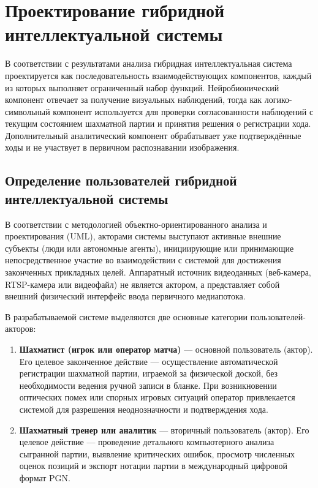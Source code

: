 \section{Проектирование гибридной интеллектуальной системы}

В соответствии с результатами анализа гибридная интеллектуальная система проектируется как последовательность взаимодействующих компонентов, каждый из которых выполняет ограниченный набор функций. Нейробионический компонент отвечает за получение визуальных наблюдений, тогда как логико-символьный компонент используется для проверки согласованности наблюдений с текущим состоянием шахматной партии и принятия решения о регистрации хода. Дополнительный аналитический компонент обрабатывает уже подтверждённые ходы и не участвует в первичном распознавании изображения.

\subsection{Определение пользователей гибридной интеллектуальной системы}

В соответствии с методологией объектно-ориентированного анализа и проектирования (UML), акторами системы выступают активные внешние субъекты (люди или автономные агенты), инициирующие или принимающие непосредственное участие во взаимодействии с системой для достижения законченных прикладных целей. Аппаратный источник видеоданных (веб-камера, RTSP-камера или видеофайл) не является актором, а представляет собой внешний физический интерфейс ввода первичного медиапотока.

В разрабатываемой системе выделяются две основные категории пользователей-акторов:

\begin{enumerate}
    \item \textbf{Шахматист (игрок или оператор матча)} --- основной пользователь (актор). Его целевое законченное действие --- осуществление автоматической регистрации шахматной партии, играемой за физической доской, без необходимости ведения ручной записи в бланке. При возникновении оптических помех или спорных игровых ситуаций оператор привлекается системой для разрешения неоднозначности и подтверждения хода.
    \item \textbf{Шахматный тренер или аналитик} --- вторичный пользователь (актор). Его целевое действие --- проведение детального компьютерного анализа сыгранной партии, выявление критических ошибок, просмотр численных оценок позиций и экспорт нотации партии в международный цифровой формат PGN.
\end{enumerate}


